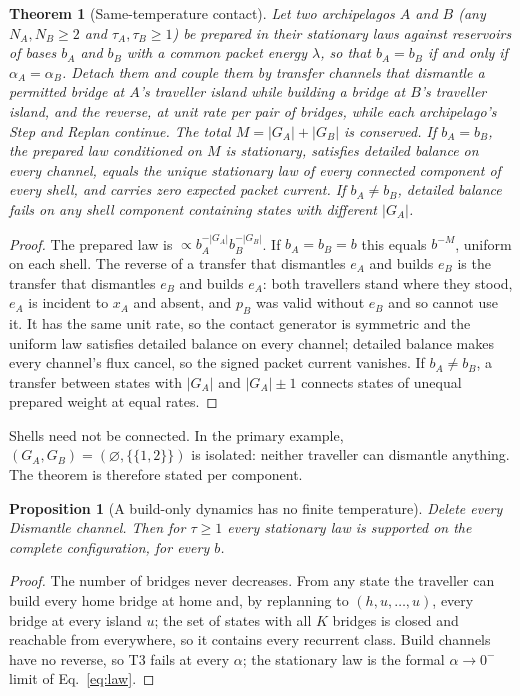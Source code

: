 \documentclass[aps,pre,preprint,superscriptaddress,nofootinbib]{revtex4-2}
\newtheorem{theorem}{Theorem}
\newtheorem{proposition}{Proposition}
\theoremstyle{definition}
\theoremstyle{remark}
\begin{document}
\begin{theorem}[Same-temperature contact]
\label{thm:contact}
Let two archipelagos $A$ and $B$ (any $N_A,N_B\ge2$ and $\tau_A,\tau_B\ge1$) be prepared in their stationary laws against reservoirs of bases $b_A$ and $b_B$ with a common packet energy $\lambda$, so that $b_A=b_B$ if and only if $\alpha_A=\alpha_B$. Detach them and couple them by transfer channels that dismantle a permitted bridge at $A$'s traveller island while building a bridge at $B$'s traveller island, and the reverse, at unit rate per pair of bridges, while each archipelago's Step and Replan continue. The total $M=|G_A|+|G_B|$ is conserved. If $b_A=b_B$, the prepared law conditioned on $M$ is stationary, satisfies detailed balance on every channel, equals the unique stationary law of every connected component of every shell, and carries zero expected packet current. If $b_A\neq b_B$, detailed balance fails on any shell component containing states with different $|G_A|$.
\end{theorem}
\begin{proof}
The prepared law is $\propto b_A^{-|G_A|}b_B^{-|G_B|}$. If $b_A=b_B=b$ this equals $b^{-M}$, uniform on each shell. The reverse of a transfer that dismantles $e_A$ and builds $e_B$ is the transfer that dismantles $e_B$ and builds $e_A$: both travellers stand where they stood, $e_A$ is incident to $x_A$ and absent, and $p_B$ was valid without $e_B$ and so cannot use it. It has the same unit rate, so the contact generator is symmetric and the uniform law satisfies detailed balance on every channel; detailed balance makes every channel's flux cancel, so the signed packet current vanishes. If $b_A\ne b_B$, a transfer between states with $|G_A|$ and $|G_A|\pm1$ connects states of unequal prepared weight at equal rates.
\end{proof}

Shells need not be connected. In the primary example, $(G_A,G_B)=(\varnothing,\{\{1,2\}\})$ is isolated: neither traveller can dismantle anything. The theorem is therefore stated per component.

\begin{proposition}[A build-only dynamics has no finite temperature]
\label{prop:oneway}
Delete every Dismantle channel. Then for $\tau\ge1$ every stationary law is supported on the complete configuration, for every $b$.
\end{proposition}
\begin{proof}
The number of bridges never decreases. From any state the traveller can build every home bridge at home and, by replanning to $(h,u,\dots,u)$, every bridge at every island $u$; the set of states with all $K$ bridges is closed and reachable from everywhere, so it contains every recurrent class. Build channels have no reverse, so T3 fails at every $\alpha$; the stationary law is the formal $\alpha\to0^-$ limit of Eq.~\eqref{eq:law}.
\end{proof}
\end{document}

